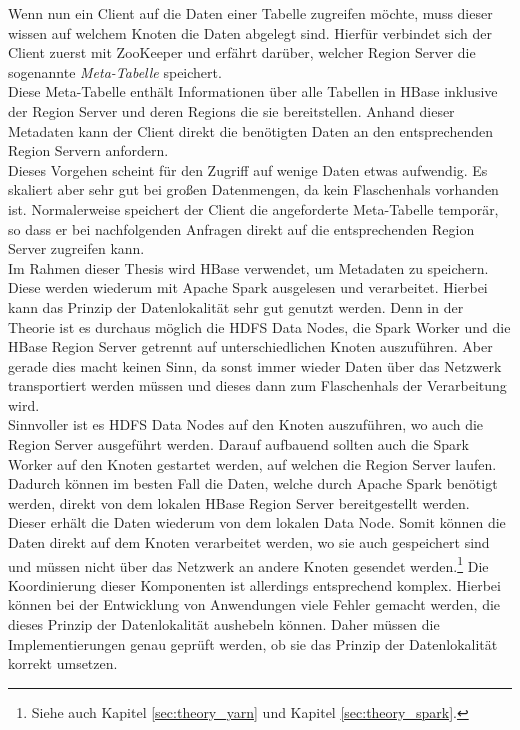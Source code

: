 \noindent
Wenn nun ein Client auf die Daten einer Tabelle zugreifen möchte, muss dieser wissen auf welchem Knoten die Daten abgelegt sind. Hierfür verbindet sich der Client zuerst mit ZooKeeper und erfährt darüber, welcher Region Server die sogenannte \textit{Meta-Tabelle} speichert.\cite[S. 579]{hadoop_definitive_guide}\\
Diese Meta-Tabelle enthält Informationen über alle Tabellen in HBase inklusive der Region Server und deren Regions die sie bereitstellen. Anhand dieser Metadaten kann der Client direkt die benötigten Daten an den entsprechenden Region Servern anfordern.\\
Dieses Vorgehen scheint für den Zugriff auf wenige Daten etwas aufwendig. Es skaliert aber sehr gut bei großen Datenmengen, da kein Flaschenhals vorhanden ist. Normalerweise speichert der Client die angeforderte Meta-Tabelle temporär, so dass er bei nachfolgenden Anfragen direkt auf die entsprechenden Region Server zugreifen kann.\\ 

\noindent
Im Rahmen dieser Thesis wird HBase verwendet, um Metadaten zu speichern. Diese werden wiederum mit Apache Spark ausgelesen und verarbeitet. Hierbei kann das Prinzip der Datenlokalität sehr gut genutzt werden. Denn in der Theorie ist es durchaus möglich die HDFS Data Nodes, die Spark Worker und die HBase Region Server getrennt auf unterschiedlichen Knoten auszuführen. Aber gerade dies macht keinen Sinn, da sonst immer wieder Daten über das Netzwerk transportiert werden müssen und dieses dann zum Flaschenhals der Verarbeitung wird.\\
Sinnvoller ist es HDFS Data Nodes auf den Knoten auszuführen, wo auch die Region Server ausgeführt werden. Darauf aufbauend sollten auch die Spark Worker auf den Knoten gestartet werden, auf welchen die Region Server laufen. Dadurch können im besten Fall die Daten, welche durch Apache Spark benötigt werden, direkt von dem lokalen HBase Region Server bereitgestellt werden. Dieser erhält die Daten wiederum von dem lokalen Data Node. Somit können die Daten direkt auf dem Knoten verarbeitet werden, wo sie auch gespeichert sind und müssen nicht über das Netzwerk an andere Knoten gesendet werden.\footnote{Siehe auch Kapitel \ref{sec:theory_yarn} und Kapitel \ref{sec:theory_spark}.} Die Koordinierung dieser Komponenten ist allerdings entsprechend komplex. Hierbei können bei der Entwicklung von Anwendungen viele Fehler gemacht werden, die dieses Prinzip der Datenlokalität aushebeln können. Daher müssen die Implementierungen genau geprüft werden, ob sie das Prinzip der Datenlokalität korrekt umsetzen.\\

